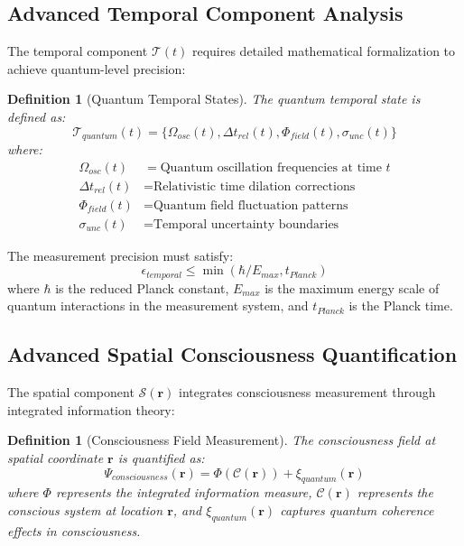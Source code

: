 \documentclass[12pt,a4paper]{article}
\newtheorem{definition}[theorem]{Definition}
\begin{document}
\subsection{Advanced Temporal Component Analysis}

The temporal component $\mathcal{T}(t)$ requires detailed mathematical formalization to achieve quantum-level precision:

\begin{definition}[Quantum Temporal States]
The quantum temporal state is defined as:
\begin{equation}
\mathcal{T}_{quantum}(t) = \{\Omega_{osc}(t), \Delta t_{rel}(t), \Phi_{field}(t), \sigma_{unc}(t)\}
\end{equation}
where:
\begin{align}
\Omega_{osc}(t) &= \text{Quantum oscillation frequencies at time } t \\
\Delta t_{rel}(t) &= \text{Relativistic time dilation corrections} \\
\Phi_{field}(t) &= \text{Quantum field fluctuation patterns} \\
\sigma_{unc}(t) &= \text{Temporal uncertainty boundaries}
\end{align}
\end{definition}

The measurement precision must satisfy:
\begin{equation}
\epsilon_{temporal} \leq \min(\hbar/E_{max}, t_{Planck})
\end{equation}
where $\hbar$ is the reduced Planck constant, $E_{max}$ is the maximum energy scale of quantum interactions in the measurement system, and $t_{Planck}$ is the Planck time.

\subsection{Advanced Spatial Consciousness Quantification}

The spatial component $\mathcal{S}(\mathbf{r})$ integrates consciousness measurement through integrated information theory:

\begin{definition}[Consciousness Field Measurement]
The consciousness field at spatial coordinate $\mathbf{r}$ is quantified as:
\begin{equation}
\Psi_{consciousness}(\mathbf{r}) = \Phi(\mathcal{C}(\mathbf{r})) + \xi_{quantum}(\mathbf{r})
\end{equation}
where $\Phi$ represents the integrated information measure, $\mathcal{C}(\mathbf{r})$ represents the conscious system at location $\mathbf{r}$, and $\xi_{quantum}(\mathbf{r})$ captures quantum coherence effects in consciousness.
\end{definition}
\end{document}

